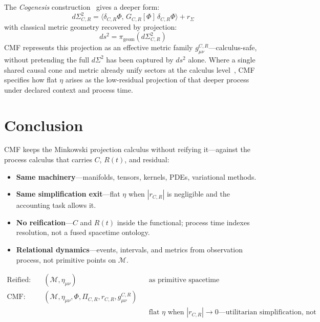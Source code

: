 \documentclass[11pt,a4paper]{article}
\newcommand{\M}{\mathcal{M}}
\newcommand{\Ph}{\Phi}
\begin{document}
The \emph{Cogenesis} construction~\cite{petrik2026cogenesis} gives a deeper form:
\begin{equation}
  d\Sigma^2_{C,R} = \langle \delta_{C,R}\Ph,\, G_{C,R}[\Ph]\, \delta_{C,R}\Ph \rangle + r_\Sigma
\end{equation}
with classical metric geometry recovered by projection:
\begin{equation}
  ds^2 = \pi_{\mathrm{geom}}(d\Sigma^2_{C,R})
\end{equation}
CMF represents this projection as an effective metric family $g^{C,R}_{\mu\nu}$---calculus-safe, without pretending the full $d\Sigma^2$ has been captured by $ds^2$ alone. Where a single shared causal cone and metric already unify sectors at the calculus level~\cite{petrik2025omqg}, CMF specifies how flat $\eta$ arises as the low-residual projection of that deeper process under declared context and process time.

\section{Conclusion}

CMF keeps the Minkowski projection calculus without reifying it---against the process calculus that carries $C$, $R(t)$, and residual:
\begin{itemize}[noitemsep]
  \item \textbf{Same machinery}---manifolds, tensors, kernels, PDEs, variational methods.
  \item \textbf{Same simplification exit}---flat $\eta$ when $|r_{C,R}|$ is negligible and the accounting task allows it.
  \item \textbf{No reification}---$C$ and $R(t)$ inside the functional; process time indexes resolution, not a fused spacetime ontology.
  \item \textbf{Relational dynamics}---events, intervals, and metrics from observation process, not primitive points on $\M$.
\end{itemize}

\vspace{1em}
\noindent
{\small
\begin{equation*}
  \boxed{
  \begin{aligned}
    \text{Reified:}\quad &( \M, \eta_{\mu\nu} ) && \text{as primitive spacetime} \\[4pt]
    \text{CMF:}\quad &( \M, \eta_{\mu\nu}, \Ph, \Pi_{C,R}, r_{C,R}, g^{C,R}_{\mu\nu} ) \\[4pt]
    &&& \text{flat $\eta$ when $|r_{C,R}| \to 0$---utilitarian simplification, not ontology.}
  \end{aligned}
  }
\end{equation*}
}
\end{document}
